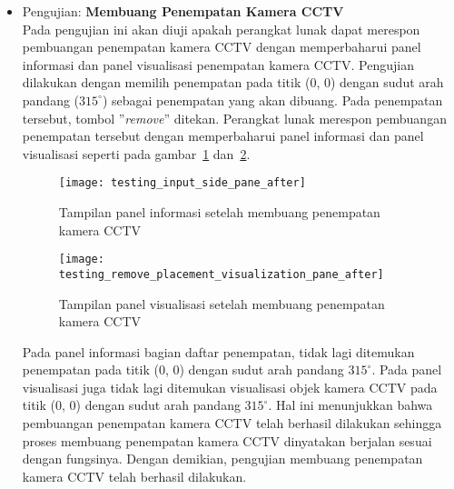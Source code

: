 \begin{itemize}
	\item Pengujian: \textbf{Membuang Penempatan Kamera CCTV}\\
	Pada pengujian ini akan diuji apakah perangkat lunak dapat merespon pembuangan penempatan kamera CCTV dengan memperbaharui panel informasi dan panel visualisasi penempatan kamera CCTV. Pengujian dilakukan dengan memilih penempatan pada titik (0, 0) dengan sudut arah pandang (\(315^\circ\)) sebagai penempatan yang akan dibuang. Pada penempatan tersebut, tombol ''\textit{remove}'' ditekan. Perangkat lunak merespon pembuangan penempatan tersebut dengan memperbaharui panel informasi dan panel visualisasi seperti pada gambar~\ref{fig:testing_remove_placement_information_pane_after} dan~\ref{fig:testing_remove_placement_visualization_pane_after}. 
	
	\begin{figure}[H]
		\centering  
		\texttt{[image: testing\_input\_side\_pane\_after]}
		\caption[Tampilan panel informasi setelah membuang penempatan kamera CCTV]{Tampilan panel informasi setelah membuang penempatan kamera CCTV}
		\label{fig:testing_remove_placement_information_pane_after}
	\end{figure}
	
	\begin{figure}[H]
		\centering  
		\texttt{[image: testing\_remove\_placement\_visualization\_pane\_after]}
		\caption[Tampilan panel visualisasi setelah membuang penempatan kamera CCTV]{Tampilan panel visualisasi setelah membuang penempatan kamera CCTV}
		\label{fig:testing_remove_placement_visualization_pane_after}
	\end{figure}	
	
	Pada panel informasi bagian daftar penempatan, tidak lagi ditemukan penempatan pada titik (0, 0) dengan sudut arah pandang \(315^\circ\). Pada panel visualisasi juga tidak lagi ditemukan visualisasi objek kamera CCTV pada titik (0, 0) dengan sudut arah pandang \(315^\circ\). Hal ini menunjukkan bahwa pembuangan penempatan kamera CCTV telah berhasil dilakukan sehingga proses membuang penempatan kamera CCTV dinyatakan berjalan sesuai dengan fungsinya. Dengan demikian, pengujian membuang penempatan kamera CCTV telah berhasil dilakukan.

\end{itemize}

